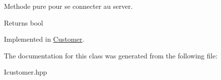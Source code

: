Methode pure pour se connecter au server. 

\begin{DoxyReturn}{Returns}
bool 
\end{DoxyReturn}


Implemented in \hyperlink{classCustomer_a802d50a64f8d850426fd1134a6a6c420}{Customer}.



The documentation for this class was generated from the following file\+:\begin{DoxyCompactItemize}
\item 
Icustomer.\+hpp\end{DoxyCompactItemize}
